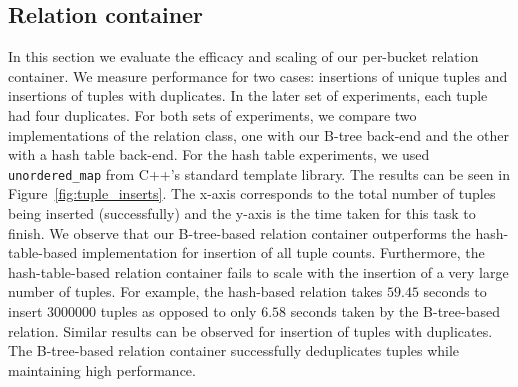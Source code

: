 \subsection{Relation container}
\label{sec:relation}

In this section we evaluate the efficacy and scaling of our per-bucket relation container. We measure performance for two cases: insertions of unique tuples and insertions of tuples with duplicates. In the later set of experiments, each tuple had four duplicates. For both sets of experiments, we compare two implementations of the relation class, one with our B-tree back-end and the other with a hash table back-end. For the hash table experiments, we used \texttt{unordered\_map} from C++'s standard template library. The results can be seen in Figure~\ref{fig:tuple_inserts}. The x-axis corresponds to the total number of tuples being inserted (successfully) and the y-axis is the time taken for this task to finish. We observe that our B-tree-based relation container outperforms the hash-table-based implementation for insertion of all tuple counts. Furthermore, the hash-table-based relation container fails to scale with the insertion of a very large number of tuples. For example, the hash-based relation takes $59.45$ seconds to insert $3000000$ tuples as opposed to only $6.58$ seconds taken by the B-tree-based relation. Similar results can be observed for insertion of tuples with duplicates. The B-tree-based relation container successfully deduplicates tuples while maintaining high performance.






